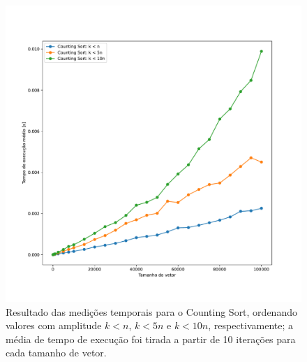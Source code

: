 \documentclass[fontsize=10pt]{article}
\begin{document}
\begin{figure}[]
\begin{center}
    \includegraphics[scale=0.4]{imagens/counting.pdf}
    \caption{Resultado das medições temporais para o Counting Sort, ordenando valores com amplitude $k < n$, $k < 5n$ e $k < 10n$, respectivamente; a média de tempo de execução foi tirada a partir de 10 iterações para cada tamanho de vetor.}
    \label{Figura 4}
\end{center}
\end{figure}
\end{document}
